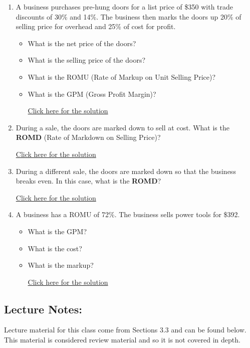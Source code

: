 \documentclass[
]{book}
\providecommand{\tightlist}{%
  \setlength{\itemsep}{0pt}\setlength{\parskip}{0pt}}
\begin{document}
\begin{enumerate}
\def\labelenumi{\arabic{enumi}.}
\tightlist
\item
  A business purchases pre-hung doors for a list price of \$350 with trade discounts of 30\% and 14\%. The business then marks the doors up 20\% of selling price for overhead and 25\% of cost for profit.

  \begin{itemize}
  \tightlist
  \item
    What is the net price of the doors?
  \item
    What is the selling price of the doors?
  \item
    What is the ROMU (Rate of Markup on Unit Selling Price)?
  \item
    What is the GPM (Gross Profit Margin)?

    \href{https://youtu.be/CMOw7ktpKgk}{Click here for the solution}
  \end{itemize}
\item
  During a sale, the doors are marked down to sell at cost. What is the \textbf{ROMD} (Rate of Markdown on Selling Price)?

  \href{https://youtu.be/rZGY5cLtock}{Click here for the solution}
\item
  During a different sale, the doors are marked down so that the business breaks even. In this case, what is the \textbf{ROMD}?

  \href{https://youtu.be/BIgdVkHfEmc}{Click here for the solution}
\item
  A business has a ROMU of 72\%. The business sells power tools for \$392.

  \begin{itemize}
  \tightlist
  \item
    What is the GPM?
  \item
    What is the cost?
  \item
    What is the markup?

    \href{https://youtu.be/En9picJQfME}{Click here for the solution}
  \end{itemize}
\end{enumerate}

\subsection*{Lecture Notes:}\label{lecture-notes-4}

Lecture material for this class come from Sections 3.3 and can be found below. This material is considered review material and so it is not covered in depth.
\end{document}
